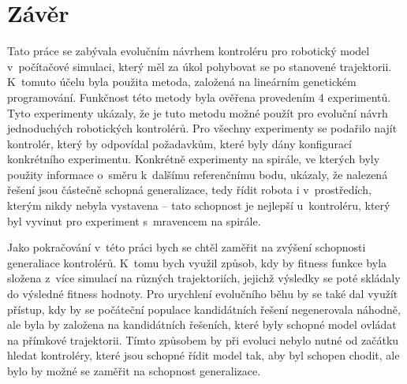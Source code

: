 \chapter{Závěr}
\label{chap:zaver}
Tato práce se zabývala evolučním návrhem kontroléru pro robotický model v~počítačové simulaci, který měl za úkol pohybovat se po stanovené trajektorii.
K~tomuto účelu byla použita metoda, založená na lineárním genetickém programování.
Funkčnost této metody byla ověřena provedením 4 experimentů.
Tyto experimenty ukázaly, že je tuto metodu možné použít pro evoluční návrh jednoduchých robotických kontrolérů.
Pro všechny experimenty se podařilo najít kontrolér, který by odpovídal požadavkům, které byly dány konfigurací konkrétního experimentu.
Konkrétně experimenty na spirále, ve kterých byly použity informace o~směru k~dalšímu referenčnímu bodu, ukázaly, že nalezená řešení jsou částečně schopná generalizace, tedy řídit robota i v~prostředích, kterým nikdy nebyla vystavena -- tato schopnost je nejlepší u~kontroléru, který byl vyvinut pro experiment s~mravencem na spirále.

Jako pokračování v~této práci bych se chtěl zaměřit na zvýšení schopnosti generaliace kontrolérů.
K~tomu bych využil způsob, kdy by fitness funkce byla složena z~více simulací na různých trajektoriích, jejichž výsledky se poté skládaly do výsledné fitness hodnoty.
Pro urychlení evolučního běhu by se také dal využít přístup, kdy by se počáteční populace kandidátních řešení negenerovala náhodně, ale byla by založena na kandidátních řešeních, které byly schopné model ovládat na přímkové trajektorii.
Tímto způsobem by při evoluci nebylo nutné od začátku hledat kontroléry, které jsou schopné řídit model tak, aby byl schopen chodit, ale bylo by možné se zaměřit na schopnost generalizace.

